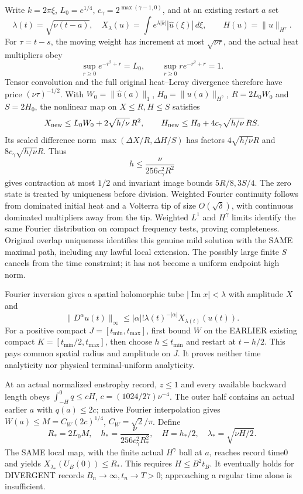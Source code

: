 \documentclass[11pt]{article}
\begin{document}
Write $k=2\pi\xi$, $L_0=e^{1/4}$,
$c_\gamma=2^{\max(\gamma-1,0)}$, and at an existing restart $a$ set
\[
 \lambda(t)=\sqrt{\nu(t-a)},\quad
 X_\lambda(u)=\int e^{\lambda|k|}|\widehat u(\xi)|\,d\xi,
 \qquad H(u)=\|u\|_{H^\gamma}.
\]
For $\tau=t-s$, the moving weight has increment at most
$\sqrt{\nu\tau}$, and the actual heat multipliers obey
\[
 \sup_{r\ge0}e^{-r^2+r}=L_0,
 \qquad \sup_{r\ge0}r e^{-r^2+r}=1.
\]
Tensor convolution and the full original heat--Leray divergence therefore
have price $(\nu\tau)^{-1/2}$. With $W_0=\|\widehat u(a)\|_1$,
$H_0=\|u(a)\|_{H^\gamma}$, $R=2L_0W_0$ and $S=2H_0$, the nonlinear map
on $X\le R,H\le S$ satisfies
\[
 X_{\rm new}\le L_0W_0+2\sqrt{h/\nu}\,R^2,
 \qquad H_{\rm new}\le H_0+4c_\gamma\sqrt{h/\nu}\,RS.
\]
Its scaled difference norm $\max(\Delta X/R,\Delta H/S)$ has factors
$4\sqrt{h/\nu}R$ and $8c_\gamma\sqrt{h/\nu}R$. Thus
\[
 h\le\frac{\nu}{256c_\gamma^2R^2}
\]
gives contraction at most $1/2$ and invariant image bounds $5R/8,3S/4$.
The zero state is treated by uniqueness before division. Weighted Fourier
continuity follows from dominated initial heat and a Volterra tip of size
$O(\sqrt\delta)$, with continuous dominated multipliers away from the tip.
Weighted $L^1$ and $H^\gamma$ limits identify the same Fourier distribution
on compact frequency tests, proving completeness. Original overlap uniqueness
identifies this genuine mild solution with the SAME maximal path, including
any lawful local extension. The possibly large finite $S$ cancels from the
time constraint; it has not become a uniform endpoint high norm.

Fourier inversion gives a spatial holomorphic tube $|\operatorname{Im}x|<\lambda$
with amplitude $X$ and
\[
 \|D^\alpha u(t)\|_\infty
 \le |\alpha|!\lambda(t)^{-|\alpha|}X_{\lambda(t)}(u(t)).
\]
For a positive compact $J=[t_{\min},t_{\max}]$, first bound $W$ on the
EARLIER existing compact $K=[t_{\min}/2,t_{\max}]$, then choose
$h\le t_{\min}$ and restart at $t-h/2$. This pays common spatial radius
and amplitude on $J$. It proves neither time analyticity nor physical
terminal-uniform analyticity.

At an actual normalized enstrophy record, $z\le1$ and every available
backward length obeys $\int_{-H}^0q\le cH$, $c=(1024/27)\nu^{-4}$.
The outer half contains an actual earlier $a$ with $q(a)\le2c$; native
Fourier interpolation gives $W(a)\le M=C_W(2c)^{1/4}$,
$C_W=\sqrt2/\pi$. Define
\[
 R_*=2L_0M,\quad h_*=\frac{\nu}{256c_\gamma^2R_*^2},
 \quad H=h_*/2,\quad \lambda_*=\sqrt{\nu H/2}.
\]
The SAME local map, with the finite actual $H^\gamma$ ball at $a$, reaches
record time0 and yields $X_{\lambda_*}(U_B(0))\le R_*$. This requires
$H\le B^2t_B$. It eventually holds for DIVERGENT records
$B_n\to\infty,t_n\to T>0$; approaching a regular time alone is insufficient.
\end{document}
